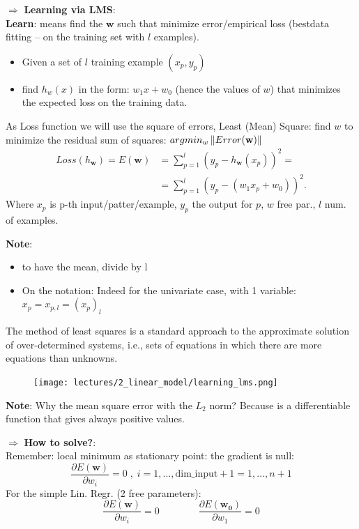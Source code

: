 \documentclass[../main.tex]{subfiles}
\begin{document}
\noindent $\Rightarrow$ \textbf{Learning via LMS}:\\
\textbf{Learn}: means find the $\textbf{w}$ such that minimize error/empirical loss (bestdata fitting – on the training set with $l$ examples).

\begin{itemize}
    \item Given a set of $l$ training example $(x_p, y_p)$
    \item find $h_w(x)$ in the form: $w_1x + w_0$ (hence the values of $w$) that minimizes the expected loss on the training data.
\end{itemize}

As Loss function we will use the square of errors, Least (Mean) Square: find $w$ to minimize the residual sum of squares: $argmin_w \left\lVert Error(\mathbf{w})\right\rVert$ 
\[\begin{aligned}
    Loss(h_\mathbf{w}) = E(\textbf{w}) &= \sum_{p = 1}^{l} (y_p - h_\mathbf{w}(x_p))^2 =\\
                            &=\sum_{p = 1}^{l} (y_p - (w_1x_p + w_0))^2
.\end{aligned}\]
Where $x_p$ is p-th input/patter/example, $y_p$ the output for $p$, $w$ free par., $l$ num. of examples.

\textbf{Note}: 
\begin{itemize}
    \item to have the mean, divide by l
    \item On the notation: Indeed for the univariate case, with 1 variable: $x_p = x_{p,l} = (x_p)_l$
\end{itemize}
The method of least squares is a standard approach to the approximate solution of over-determined systems, i.e., sets of equations in which there are more equations than unknowns.
\begin{figure}[H]
    \centering
    \texttt{[image: lectures/2\_linear\_model/learning\_lms.png]}
\end{figure}

\textbf{Note}: Why the mean square error with the $L_2$ norm? Because is a differentiable function that gives always positive values.

\noindent $\Rightarrow$ \textbf{How to solve?}:\\
Remember: local minimum as stationary point: the gradient is null:
$$ \frac{\partial E(\mathbf{w})}{\partial{w_i}} = 0 \; , \; i = 1, \dots,  \text{dim\_input}+1 = 1, \dots,  n+1$$
For the simple Lin. Regr. (2 free parameters):
$$ \frac{\partial E(\mathbf{w})}{\partial{w_i}} = 0 \qquad \qquad \frac{\partial E(\mathbf{w_0})}{\partial{w_1}} = 0 $$
\end{document}
